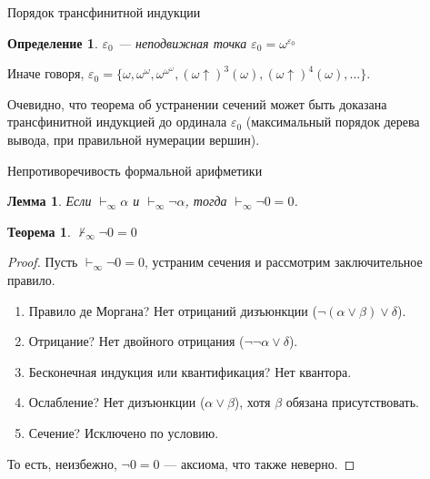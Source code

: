 \documentclass[aspectratio=169]{beamer}
\newtheorem{thm}{Теорема}[section]
\newtheorem{dfn}{Определение}[section]
\newtheorem{lmm}{Лемма}[section]
\begin{document}
\begin{frame}{Порядок трансфинитной индукции}
\begin{dfn}$\varepsilon_0$ --- неподвижная точка $\varepsilon_0 = \omega^{\varepsilon_0}$\end{dfn}

Иначе говоря, $\varepsilon_0 = \{ \omega, \omega^\omega, \omega^{\omega^\omega}, (\omega \uparrow)^3(\omega), (\omega\uparrow)^4(\omega), \dots \}$.

Очевидно, что теорема об устранении сечений может быть доказана трансфинитной индукцией до ординала $\varepsilon_0$
(максимальный порядок дерева вывода, при правильной нумерации вершин).
\end{frame}

\begin{frame}{Непротиворечивость формальной арифметики}
\begin{lmm}Если $\vdash_\infty\alpha$ и $\vdash_\infty\neg\alpha$, тогда $\vdash_\infty\neg 0=0$.
\end{lmm}

\begin{thm}$\not\vdash_\infty\neg 0=0$\end{thm}
\begin{proof} \pause
Пусть $\vdash_\infty\neg 0=0$, устраним сечения и рассмотрим заключительное правило.
\pause
\begin{enumerate}
\item Правило де Моргана? \pause Нет отрицаний дизъюнкции ($\neg(\alpha\vee\beta)\vee\delta$). \pause
\item Отрицание? \pause Нет двойного отрицания ($\neg\neg\alpha\vee\delta$). \pause
\item Бесконечная индукция или квантификация? \pause Нет квантора. \pause
\item Ослабление? \pause Нет дизъюнкции ($\alpha \vee \beta$), хотя $\beta$ обязана присутствовать. \pause
\item Сечение? \pause Исключено по условию.
\end{enumerate}

То есть, неизбежно, $\neg 0=0$ --- аксиома, что также неверно.
\end{proof}
\end{frame}
\end{document}
